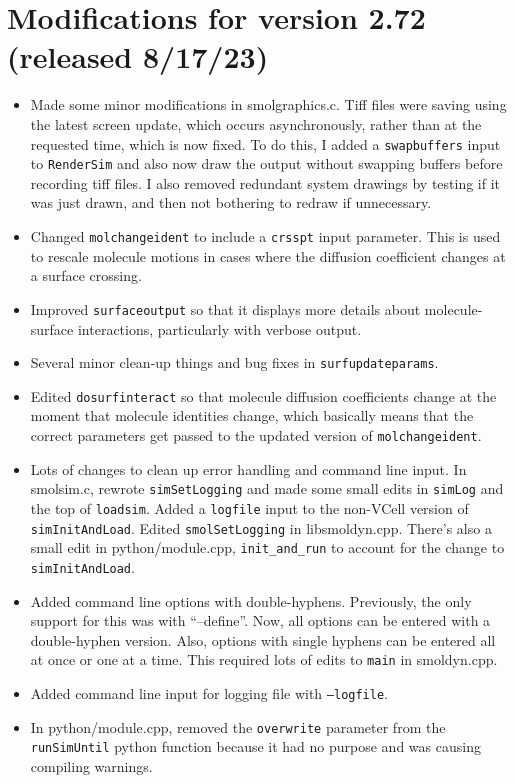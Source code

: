 \documentclass {scrbook}
\newcommand {\ttt} {\texttt}
\begin{document}
\section{Modifications for version 2.72 (released 8/17/23)}
\begin{itemize}
\item Made some minor modifications in smolgraphics.c. Tiff files were saving using the latest screen update, which occurs asynchronously, rather than at the requested time, which is now fixed. To do this, I added a \ttt{swapbuffers} input to \ttt{RenderSim} and also now draw the output without swapping buffers before recording tiff files. I also removed redundant system drawings by testing if it was just drawn, and then not bothering to redraw if unnecessary.
\item Changed \ttt{molchangeident} to include a \ttt{crsspt} input parameter. This is used to rescale molecule motions in cases where the diffusion coefficient changes at a surface crossing.
\item Improved \ttt{surfaceoutput} so that it displays more details about molecule-surface interactions, particularly with verbose output.
\item Several minor clean-up things and bug fixes in \ttt{surfupdateparams}.
\item Edited \ttt{dosurfinteract} so that molecule diffusion coefficients change at the moment that molecule identities change, which basically means that the correct parameters get passed to the updated version of \ttt{molchangeident}.
\item Lots of changes to clean up error handling and command line input. In smolsim.c, rewrote \ttt{simSetLogging} and made some small edits in \ttt{simLog} and the top of \ttt{loadsim}. Added a \ttt{logfile} input to the non-VCell version of \ttt{simInitAndLoad}. Edited \ttt{smolSetLogging} in libsmoldyn.cpp. There's also a small edit in python/module.cpp, \ttt{init\_and\_run} to account for the change to \ttt{simInitAndLoad}.
\item Added command line options with double-hyphens. Previously, the only support for this was with ``--define''. Now, all options can be entered with a double-hyphen version. Also, options with single hyphens can be entered all at once or one at a time. This required lots of edits to \ttt{main} in smoldyn.cpp.
\item Added command line input for logging file with \ttt{--logfile}.
\item In python/module.cpp, removed the \ttt{overwrite} parameter from the \ttt{runSimUntil} python function because it had no purpose and was causing compiling warnings.

\end{itemize}
\end{document}
